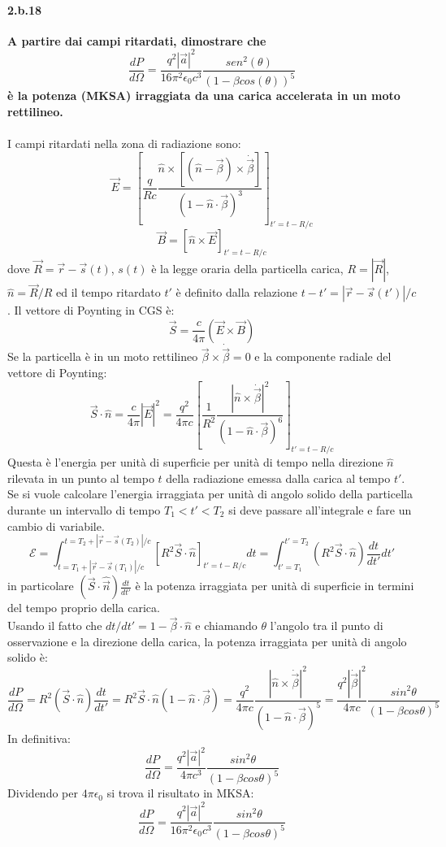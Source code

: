 \documentclass[twoside]{article}
\begin{document}
\paragraph{2.b.18}\textbf{A partire dai campi ritardati, dimostrare che
\[
\frac{dP}{d\Omega}= \frac{q^2 |\vec{a}|^2}{16 \pi^2\epsilon_0 c^3}\frac{sen^2(\theta)}{(1-\beta cos(\theta))^5}
\]
è la potenza (MKSA) irraggiata da una carica accelerata in un moto rettilineo. 
}\\ \\
I campi ritardati nella zona di radiazione sono:
\[
\vec{E}=\left[\frac{q}{R c}\frac{\hat{n}\times[(\hat{n}-\vec{\beta})\times \dot{\vec{\beta}}]}{(1-\hat{n}\cdot \vec{\beta})^3}\right]_{t'=t-R/c}
\]
\[
\vec{B}=[\hat{n}\times \vec{E}]_{t'=t-R/c}
\]
dove $\vec{R}=\vec{r}-\vec{s}(t)$, $s(t)$ è la legge oraria della particella carica, $R=|\vec{R}|$, $\hat{n}=\vec{R}/R$ ed il tempo ritardato $t'$ è definito dalla relazione $t-t'=|\vec{r}-\vec{s}(t')|/c$.
Il vettore di Poynting in CGS è:
\[
\vec{S}=\frac{c}{4 \pi}(\vec{E}\times \vec{B})
\]
Se la particella è in un moto rettilineo $\vec{\beta}\times \dot{\vec{\beta}}=0$ e la componente radiale del vettore di Poynting:
\[
\vec{S}\cdot\hat{n}= \frac{c}{4 \pi} |\vec{E}|^2=\frac{q^2}{4 \pi c} \left[\frac{1}{R^2}\frac{|\hat{n} \times \dot{\vec{\beta}}|^2} {(1-\hat{n}\cdot\vec{\beta})^6}\right]_{t'=t-R/c}
\]
Questa è l’energia per unità di superficie per unità di tempo nella direzione $\hat{n}$ rilevata in un punto al tempo $t$ della radiazione emessa dalla carica al tempo $t'$. Se si vuole calcolare l'energia irraggiata per unità di angolo solido della particella durante un intervallo di tempo $T_1<t'<T_2 $ si deve passare all'integrale e fare un cambio di variabile.
\[
\mathcal{E}=\int_{t=T_1+ |\vec{r}-\vec{s}(T_1)|/c}^{t=T_2+ |\vec{r}-\vec{s}(T_2)|/c} [R^2 \vec{S}\cdot \hat{n}]_{t'=t-R/c} dt= \int_{t'=T_1}^{t'=T_2}(R^2 \vec{S}\cdot \hat{n})\frac{dt}{dt'}dt'
\]
in particolare $(\vec{S}\cdot \hat{\vec{n}})\frac{dt}{dt'}$ è la potenza irraggiata per unità di superficie in termini del tempo proprio della carica.\\
Usando il fatto che $dt/dt'=1-\vec{\beta} \cdot \hat{n}$ e chiamando $\theta$ l'angolo tra il punto di osservazione e la direzione della carica, la potenza irraggiata per unità di angolo solido è:
\[
\frac{dP}{d\Omega}=R^2 (\vec{S}\cdot \hat{n})\frac{dt}{dt'}= R^2\vec{S}\cdot \hat{n}(1-\hat{n}\cdot\vec{\beta})= \frac{q^2}{4 \pi c} \frac{|\hat{n}\times \dot{\vec{\beta}}|^2}{(1-\hat{n}\cdot \vec{\beta})^5}=\frac{q^2 |\dot{\vec{\beta}}|^2}{4 \pi c} \frac{sin^2\theta}{(1-\beta cos \theta)^5}
\]
In definitiva:
\[
\frac{dP}{d\Omega}=\frac{q^2|\vec{a}|^2}{4 \pi c^3}\frac{sin^2\theta}{(1-\beta cos\theta)^5}
\]
Dividendo per $4 \pi \epsilon_0$ si trova il risultato in MKSA:
\[
\frac{dP}{d\Omega}=\frac{q^2|\vec{a}|^2}{16 \pi^2 \epsilon_0 c^3}\frac{sin^2\theta}{(1-\beta cos\theta)^5}
\]
\end{document}
